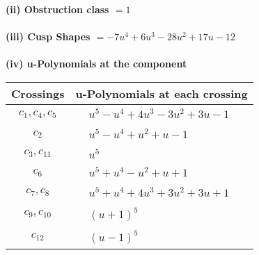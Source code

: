\documentclass[1p]{elsarticle_modified}
\theoremstyle{definition}
\begin{document}
\flushleft \textbf{(ii) Obstruction class $= 1$}\\~\\
\flushleft \textbf{(iii) Cusp Shapes $= -7 u^4+6 u^3-28 u^2+17 u-12$}\\~\\
\newpage\renewcommand{\arraystretch}{1}
\flushleft \textbf{(iv) u-Polynomials at the component}\newline \\
\begin{tabular}{m{50pt}|m{274pt}}
Crossings & \hspace{64pt}u-Polynomials at each crossing \\
\hline $$\begin{aligned}c_{1},c_{4},c_{5}\end{aligned}$$&$\begin{aligned}
&u^5- u^4+4 u^3-3 u^2+3 u-1
\end{aligned}$\\
\hline $$\begin{aligned}c_{2}\end{aligned}$$&$\begin{aligned}
&u^5- u^4+u^2+u-1
\end{aligned}$\\
\hline $$\begin{aligned}c_{3},c_{11}\end{aligned}$$&$\begin{aligned}
&u^5
\end{aligned}$\\
\hline $$\begin{aligned}c_{6}\end{aligned}$$&$\begin{aligned}
&u^5+u^4- u^2+u+1
\end{aligned}$\\
\hline $$\begin{aligned}c_{7},c_{8}\end{aligned}$$&$\begin{aligned}
&u^5+u^4+4 u^3+3 u^2+3 u+1
\end{aligned}$\\
\hline $$\begin{aligned}c_{9},c_{10}\end{aligned}$$&$\begin{aligned}
&(u+1)^5
\end{aligned}$\\
\hline $$\begin{aligned}c_{12}\end{aligned}$$&$\begin{aligned}
&(u-1)^5
\end{aligned}$\\
\hline
\end{tabular}\\~\\
\end{document}
